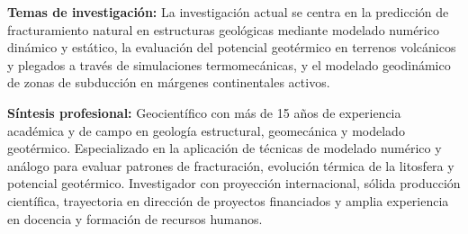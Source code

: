 

\begin{cvparagraph}

\textbf{Temas de investigación:} La investigación actual se centra en la predicción de fracturamiento natural en estructuras geológicas mediante modelado numérico dinámico y estático, la evaluación del potencial geotérmico en terrenos volcánicos y plegados a través de simulaciones termomecánicas, y el modelado geodinámico de zonas de subducción en márgenes continentales activos.


\textbf{Síntesis profesional:} Geocientífico con más de 15 años de experiencia académica y de campo en geología estructural, geomecánica y modelado geotérmico. Especializado en la aplicación de técnicas de modelado numérico y análogo para evaluar patrones de fracturación, evolución térmica de la litosfera y potencial geotérmico. Investigador con proyección internacional, sólida producción científica, trayectoria en dirección de proyectos financiados y amplia experiencia en docencia y formación de recursos humanos.



\end{cvparagraph}
